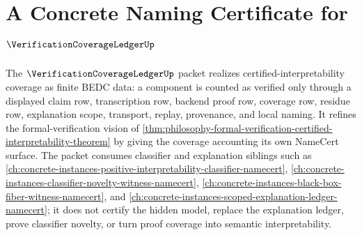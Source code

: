 \chapter{A Concrete Naming Certificate for $\VerificationCoverageLedgerUp$}
\label{ch:concrete-instances-verification-coverage-ledger-namecert}

The $\VerificationCoverageLedgerUp$ packet realizes certified-interpretability coverage as finite BEDC data: a component is counted as verified only through a displayed claim row, transcription row, backend proof row, coverage row, residue row, explanation scope, transport, replay, provenance, and local naming. It refines the formal-verification vision of \autoref{thm:philosophy-formal-verification-certified-interpretability-theorem} by giving the coverage accounting its own NameCert surface. The packet consumes classifier and explanation siblings such as \autoref{ch:concrete-instances-positive-interpretability-classifier-namecert}, \autoref{ch:concrete-instances-classifier-novelty-witness-namecert}, \autoref{ch:concrete-instances-black-box-fiber-witness-namecert}, and \autoref{ch:concrete-instances-scoped-explanation-ledger-namecert}; it does not certify the hidden model, replace the explanation ledger, prove classifier novelty, or turn proof coverage into semantic interpretability.

